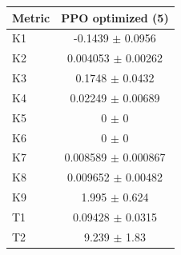 \begin{tabular}{lc}
\toprule
Metric & PPO optimized (5) \\
\midrule
K1 & -0.1439 $\pm$ 0.0956 \\
K2 & 0.004053 $\pm$ 0.00262 \\
K3 & 0.1748 $\pm$ 0.0432 \\
K4 & 0.02249 $\pm$ 0.00689 \\
K5 & 0 $\pm$ 0 \\
K6 & 0 $\pm$ 0 \\
K7 & 0.008589 $\pm$ 0.000867 \\
K8 & 0.009652 $\pm$ 0.00482 \\
K9 & 1.995 $\pm$ 0.624 \\
T1 & 0.09428 $\pm$ 0.0315 \\
T2 & 9.239 $\pm$ 1.83 \\
\bottomrule
\end{tabular}
